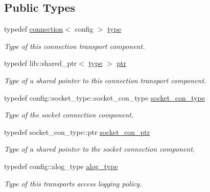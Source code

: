 \subsection*{Public Types}
\begin{DoxyCompactItemize}
\item 
typedef \hyperlink{classwebsocketpp_1_1transport_1_1asio_1_1connection}{connection}$<$ config $>$ \hyperlink{classwebsocketpp_1_1transport_1_1asio_1_1connection_a8d3c48e550b2570f65cf84de034068c8}{type}
\begin{DoxyCompactList}\small\item\em Type of this connection transport component. \end{DoxyCompactList}\item 
typedef lib\+::shared\+\_\+ptr$<$ \hyperlink{classwebsocketpp_1_1transport_1_1asio_1_1connection_a8d3c48e550b2570f65cf84de034068c8}{type} $>$ \hyperlink{classwebsocketpp_1_1transport_1_1asio_1_1connection_aa6f25556860a154c4dacb4dac1dce8e4}{ptr}
\begin{DoxyCompactList}\small\item\em Type of a shared pointer to this connection transport component. \end{DoxyCompactList}\item 
typedef config\+::socket\+\_\+type\+::socket\+\_\+con\+\_\+type \hyperlink{classwebsocketpp_1_1transport_1_1asio_1_1connection_a85712056cec173324f790a92a0d94021}{socket\+\_\+con\+\_\+type}
\begin{DoxyCompactList}\small\item\em Type of the socket connection component. \end{DoxyCompactList}\item 
typedef socket\+\_\+con\+\_\+type\+::ptr \hyperlink{classwebsocketpp_1_1transport_1_1asio_1_1connection_a2a0647a77eebc0e37111a4d39e6dc726}{socket\+\_\+con\+\_\+ptr}
\begin{DoxyCompactList}\small\item\em Type of a shared pointer to the socket connection component. \end{DoxyCompactList}\item 
typedef config\+::alog\+\_\+type \hyperlink{classwebsocketpp_1_1transport_1_1asio_1_1connection_a457470621386c06374aa3bd189a4715e}{alog\+\_\+type}
\begin{DoxyCompactList}\small\item\em Type of this transport\textquotesingle{}s access logging policy. \end{DoxyCompactList}\item 

\end{DoxyCompactItemize}

